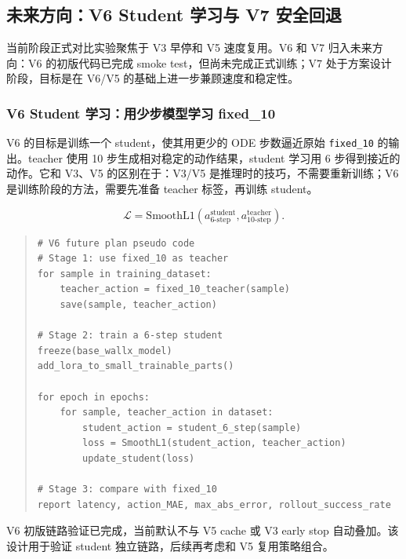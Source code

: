 \documentclass[UTF8,a4paper,12pt]{ctexart}
\begin{document}
\subsection{未来方向：V6 Student 学习与 V7 安全回退}

当前阶段正式对比实验聚焦于 V3 早停和 V5 速度复用。V6 和 V7 归入未来方向：V6 的初版代码已完成 smoke test，但尚未完成正式训练；V7 处于方案设计阶段，目标是在 V6/V5 的基础上进一步兼顾速度和稳定性。

\subsubsection{V6 Student 学习：用少步模型学习 fixed\_10}

V6 的目标是训练一个 student，使其用更少的 ODE 步数逼近原始 \texttt{fixed\_10} 的输出。teacher 使用 10 步生成相对稳定的动作结果，student 学习用 6 步得到接近的动作。它和 V3、V5 的区别在于：V3/V5 是推理时的技巧，不需要重新训练；V6 是训练阶段的方法，需要先准备 teacher 标签，再训练 student。

\begin{equation}
\mathcal{L}=\mathrm{SmoothL1}\left(a^{\mathrm{student}}_{6\text{-step}}, a^{\mathrm{teacher}}_{10\text{-step}}\right).
\end{equation}

\begin{quote}\small
\begin{verbatim}
# V6 future plan pseudo code
# Stage 1: use fixed_10 as teacher
for sample in training_dataset:
    teacher_action = fixed_10_teacher(sample)
    save(sample, teacher_action)

# Stage 2: train a 6-step student
freeze(base_wallx_model)
add_lora_to_small_trainable_parts()

for epoch in epochs:
    for sample, teacher_action in dataset:
        student_action = student_6_step(sample)
        loss = SmoothL1(student_action, teacher_action)
        update_student(loss)

# Stage 3: compare with fixed_10
report latency, action_MAE, max_abs_error, rollout_success_rate
\end{verbatim}
\end{quote}

V6 初版链路验证已完成，当前默认不与 V5 cache 或 V3 early stop 自动叠加。该设计用于验证 student 独立链路，后续再考虑和 V5 复用策略组合。
\end{document}
